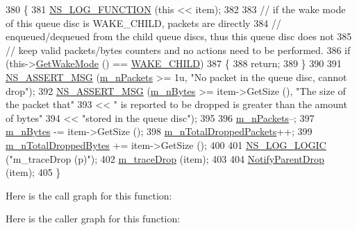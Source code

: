 \begin{DoxyCode}
380 \{
381   \hyperlink{log-macros-disabled_8h_a90b90d5bad1f39cb1b64923ea94c0761}{NS\_LOG\_FUNCTION} (\textcolor{keyword}{this} << item);
382 
383   \textcolor{comment}{// if the wake mode of this queue disc is WAKE\_CHILD, packets are directly}
384   \textcolor{comment}{// enqueued/dequeued from the child queue discs, thus this queue disc does not}
385   \textcolor{comment}{// keep valid packets/bytes counters and no actions need to be performed.}
386   \textcolor{keywordflow}{if} (this->\hyperlink{classns3_1_1QueueDisc_a51a079153b474eec1bad9abe715d9510}{GetWakeMode} () == \hyperlink{classns3_1_1QueueDisc_a0b9b32e71d5becf66e6ac4b3d3de7c8bad2dbf3b0b56e3e0d4d0f8f944c4d0fcd}{WAKE\_CHILD})
387     \{
388       \textcolor{keywordflow}{return};
389     \}
390 
391   \hyperlink{assert_8h_aff5ece9066c74e681e74999856f08539}{NS\_ASSERT\_MSG} (\hyperlink{classns3_1_1QueueDisc_a7afc9edf0fdb517d088ebe8d3747fbef}{m\_nPackets} >= 1u, \textcolor{stringliteral}{"No packet in the queue disc, cannot drop"});
392   \hyperlink{assert_8h_aff5ece9066c74e681e74999856f08539}{NS\_ASSERT\_MSG} (\hyperlink{classns3_1_1QueueDisc_a5c9e0e5c858f333bb15089eea58a1e3b}{m\_nBytes} >= item->GetSize (), \textcolor{stringliteral}{"The size of the packet that"}
393                  << \textcolor{stringliteral}{" is reported to be dropped is greater than the amount of bytes"}
394                  << \textcolor{stringliteral}{"stored in the queue disc"});
395 
396   \hyperlink{classns3_1_1QueueDisc_a7afc9edf0fdb517d088ebe8d3747fbef}{m\_nPackets}--;
397   \hyperlink{classns3_1_1QueueDisc_a5c9e0e5c858f333bb15089eea58a1e3b}{m\_nBytes} -= item->GetSize ();
398   \hyperlink{classns3_1_1QueueDisc_a2974596141f300298255f0ae85faf0cc}{m\_nTotalDroppedPackets}++;
399   \hyperlink{classns3_1_1QueueDisc_a06645b0916c11b3da27195ed99ca8ce7}{m\_nTotalDroppedBytes} += item->GetSize ();
400 
401   \hyperlink{group__logging_ga88acd260151caf2db9c0fc84997f45ce}{NS\_LOG\_LOGIC} (\textcolor{stringliteral}{"m\_traceDrop (p)"});
402   \hyperlink{classns3_1_1QueueDisc_a4d59074e7f6aa601eee90f5cd87d423f}{m\_traceDrop} (item);
403 
404   \hyperlink{classns3_1_1QueueDisc_aee0b845da519a8121dbe5a397ed63b54}{NotifyParentDrop} (item);
405 \}
\end{DoxyCode}


Here is the call graph for this function\+:




Here is the caller graph for this function\+:


